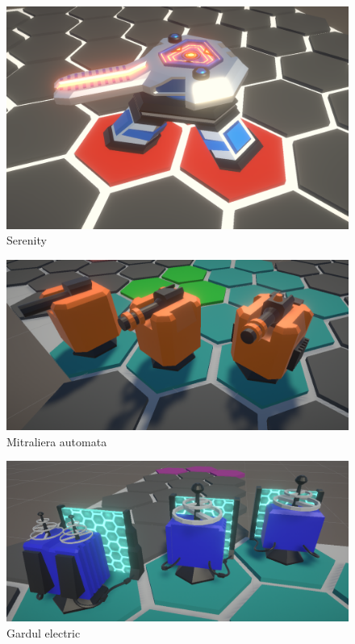 \documentclass[12pt, a4paper]{article}
\begin{document}
	\begin{figure}[H]
		\centering
		\includegraphics[width=1\textwidth]{Serenity.png}
		\caption{Serenity}
		\label{fig: serenity}
	\end{figure}
	
	
	\begin{figure}[H]
		\centering
		\includegraphics[width=1\textwidth]{machineGun.png}
		\caption{Mitraliera automata}
		\label{fig: machineGun}
	\end{figure}

	\begin{figure}[H]
		\centering
		\includegraphics[width=1\textwidth]{electricFence.png}
		\caption{Gardul electric}
		\label{fig: electricFence}
	\end{figure}
\end{document}
